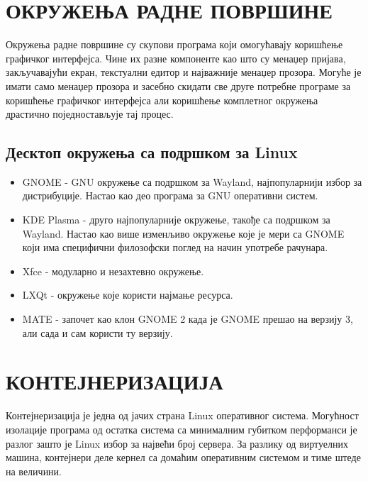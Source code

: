 \documentclass[a4paper,14pt]{article}
\begin{document}
\section{ОКРУЖЕЊА РАДНЕ ПОВРШИНЕ}
Окружења радне површине су скупови програма који омогућавају коришћење графичког интерфејса. Чине их разне компоненте као што су менаџер пријава, закључавајући екран, текстуални едитор и најважније менаџер прозора. Могуће је имати само менаџер прозора и засебно скидати све друге потребне програме за коришћење графичког интерфејса али коришћење комплетног окружења драстично поједностављује тај процес.
\subsection{Десктоп окружења са подршком за Linux}
\begin{itemize}
\item GNOME\cite{gnome} - GNU окружење са подршком за Wayland, најпопуларнији избор за дистрибуције. Настао као део програма за GNU оперативни систем.
\item KDE Plasma\cite{kdeplasma} - друго најпопуларније окружење, такође са подршком за Wayland. Настао као више изменљиво окружење које је мери са GNOME који има специфични филозофски поглед на начин употребе рачунара.
\item Xfce\cite{xfce} - модуларно и незахтевно окружење.
\item LXQt\cite{lxqt} - окружење које користи најмање ресурса.
\item MATE\cite{mate} - започет као клон GNOME 2 када је GNOME прешао на верзију 3, али сада и сам користи ту верзију.
\end{itemize}
\newpage

\section{КОНТЕЈНЕРИЗАЦИЈА}
Контејнеризација је једна од јачих страна Linux оперативног система. Могућност изолације програма од остатка система са минималним губитком перформанси је разлог зашто је Linux избор за највећи број сервера. За разлику од виртуелних машина, контејнери деле кернел са домаћим оперативним системом и тиме штеде на величини.
\end{document}
